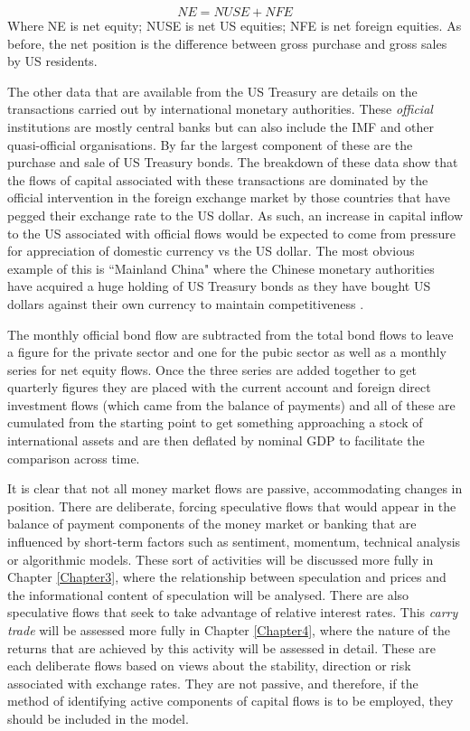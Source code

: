 \documentclass[12pt, a4paper, oneside]{article}\usepackage[]{graphicx}\usepackage[]{color}
\begin{document}
\begin{equation}
NE = NUSE + NFE
\end{equation} 
Where NE is net equity; NUSE is net US equities; NFE is net foreign equities.  As before, the net position is the difference between gross purchase and gross sales by US residents.  

The other data that are available from the US Treasury are details on the transactions carried out by international monetary authorities.  These \emph{official} institutions are mostly central banks but can also include the IMF and other quasi-official organisations. By far the largest component of these are the purchase and sale of US Treasury bonds.  The breakdown of these data show that the flows of capital associated with these transactions are dominated by the official intervention in the foreign exchange market by those countries that have pegged their exchange rate to the US dollar.  As such, an increase in capital inflow to the US associated with official flows would be expected to come from pressure for appreciation of domestic currency vs the US dollar.  The most obvious example of  this is ``Mainland China" where the Chinese monetary authorities have acquired a huge holding of US Treasury bonds as they have bought US dollars against their own currency to maintain competitiveness \citep{TIC}.

The monthly official bond flow are subtracted from the total bond flows to leave a figure for the private sector and one for the pubic sector as well as a monthly series for net equity flows.  Once the three series  are added together to get quarterly figures they are placed with the current account and foreign direct investment flows (which came from the balance of payments) and all of these are cumulated from the starting point to get something approaching a stock of international assets and are then deflated by nominal GDP to facilitate the comparison across time. 

It is clear that not all money market flows are passive, accommodating changes in position.  There are deliberate, forcing speculative flows that would appear in the balance of payment components of the money market or banking that are influenced by short-term factors such as sentiment, momentum, technical analysis or algorithmic models.  These sort of activities will be discussed more fully in Chapter \ref{Chapter3}, where the relationship between speculation and prices and the informational content of speculation will be analysed.  There are also speculative flows that seek to take advantage of relative interest rates.  This \emph{carry trade} will be assessed more fully in Chapter \ref{Chapter4}, where the nature of the returns that are achieved by this activity will be assessed in detail.     These are each deliberate flows based on views about the stability, direction or risk associated with exchange rates.  They are not passive, and therefore, if the method of identifying active components of capital flows is to be employed, they should be included in the model. 
\end{document}
